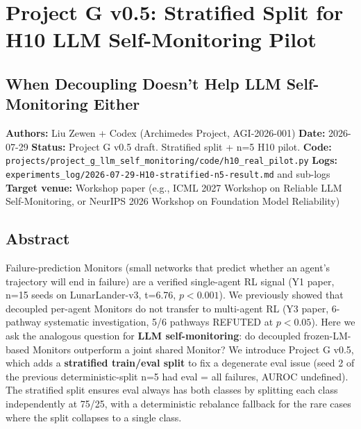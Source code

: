 \documentclass[
]{article}
\author{}
\date{}
\begin{document}
\section{Project G v0.5: Stratified Split for H10 LLM Self-Monitoring
Pilot}\label{project-g-v0.5-stratified-split-for-h10-llm-self-monitoring-pilot}

\subsection{When Decoupling Doesn't Help LLM Self-Monitoring
Either}\label{when-decoupling-doesnt-help-llm-self-monitoring-either}

\textbf{Authors:} Liu Zewen + Codex (Archimedes Project, AGI-2026-001)
\textbf{Date:} 2026-07-29 \textbf{Status:} Project G v0.5 draft.
Stratified split + n=5 H10 pilot. \textbf{Code:}
\texttt{projects/project\_g\_llm\_self\_monitoring/code/h10\_real\_pilot.py}
\textbf{Logs:}
\texttt{experiments\_log/2026-07-29-H10-stratified-n5-result.md} and
sub-logs \textbf{Target venue:} Workshop paper (e.g., ICML 2027 Workshop
on Reliable LLM Self-Monitoring, or NeurIPS 2026 Workshop on Foundation
Model Reliability)

\subsection{Abstract}\label{abstract}

Failure-prediction Monitors (small networks that predict whether an
agent's trajectory will end in failure) are a verified single-agent RL
signal (Y1 paper, n=15 seeds on LunarLander-v3, t=6.76, \(p<0.001\)). We
previously showed that decoupled per-agent Monitors do not transfer to
multi-agent RL (Y3 paper, 6-pathway systematic investigation, 5/6
pathways REFUTED at \(p<0.05\)). Here we ask the analogous question for
\textbf{LLM self-monitoring}: do decoupled frozen-LM-based Monitors
outperform a joint shared Monitor? We introduce Project G v0.5, which
adds a \textbf{stratified train/eval split} to fix a degenerate eval
issue (seed 2 of the previous deterministic-split n=5 had eval = all
failures, AUROC undefined). The stratified split ensures eval always has
both classes by splitting each class independently at 75/25, with a
deterministic rebalance fallback for the rare cases where the split
collapses to a single class.
\end{document}
